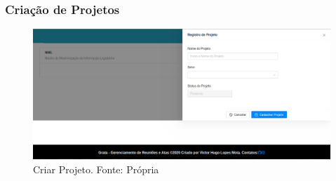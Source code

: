 \subsubsection{Criação de Projetos}

\begin{figure}[H]
    \centering
    \includegraphics[width=1.0\textwidth]{figuras/criar_projeto.png}
    \caption{Criar Projeto. Fonte: Própria}
    \label{img:criacao_de_projeto}
\end{figure}